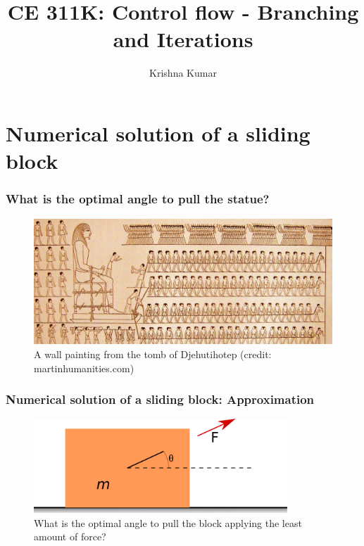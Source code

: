 \documentclass[handout]{beamer}
\title[CE 311K: Control flow]{CE 311K: Control flow - Branching and Iterations}
\author{Krishna Kumar} %
\institute[UT Austin] %
{
University of Texas at Austin \\
\medskip
\href{mailto:krishnak@utexas.edu}{krishnak@utexas.edu} %
}
\date{} %
\begin{document}
\begin{frame}
\titlepage %
\end{frame}

\newif\ifshowtoc
\showtoctrue%

\AtBeginSection{%
	\ifshowtoc
	\begin{frame}
		\tableofcontents[currentsection, subsectionstyle=show/show/hide]
	\end{frame}
	\fi
}


\section{Numerical solution of a sliding block}
\begin{frame}
	\frametitle{What is the optimal angle to pull the statue?}
	\begin{figure}[ht]
		\centering
		\includegraphics[width=\textwidth]{figs/egypt-pyramid.jpg}
		\caption*{A wall painting from the tomb of Djehutihotep (credit: martinhumanities.com)}
	\end{figure}
\end{frame}

\begin{frame}
	\frametitle{Numerical solution of a sliding block: Approximation}
	\begin{figure}[ht]
		\centering
		\includegraphics[width=0.85\textwidth]{figs/sliding-block.png}
		\caption*{What is the optimal angle to pull the block applying the least amount of force?}
	\end{figure}
\end{frame}
\end{document}
